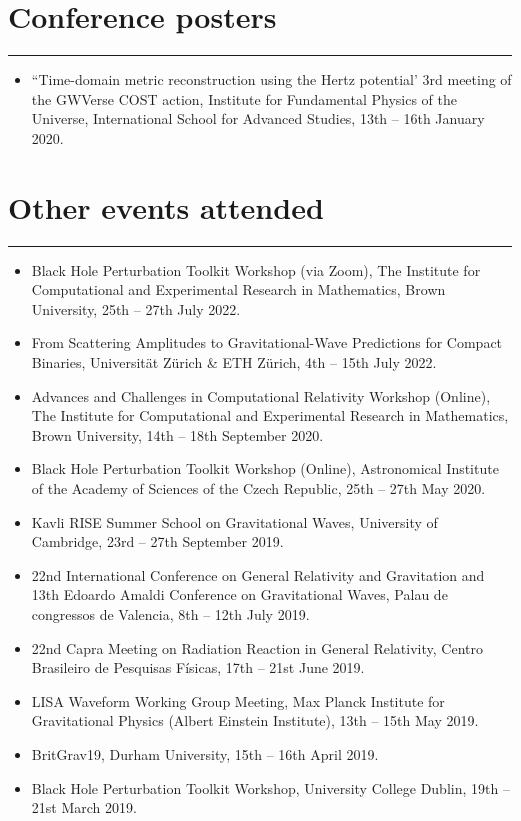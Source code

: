 \documentclass[10.5pt, oneside]{article}   	%
\begin{document}
{\color{Sectioncolour}
\section*{Conference posters}
\vspace{-3mm}
\noindent\rule{\linewidth}{0.6pt}}
\begin{itemize}
\item ``Time-domain metric reconstruction using the Hertz potential' 3rd meeting of the GWVerse COST action, Institute for Fundamental Physics of the Universe, International School for Advanced Studies, 13th -- 16th January 2020.
\end{itemize} 

 
{\color{Sectioncolour}
\section*{Other events attended}
\vspace{-3mm}
\noindent\rule{\linewidth}{0.6pt}}
\begin{itemize}
\item Black Hole Perturbation Toolkit Workshop (via Zoom), The Institute for Computational and Experimental Research in Mathematics, Brown University, 25th -- 27th July 2022.
\item From Scattering Amplitudes to Gravitational-Wave Predictions for Compact Binaries, Universität Zürich \& ETH Zürich, 4th -- 15th July 2022.
\item Advances and Challenges in Computational Relativity Workshop (Online), The Institute for Computational and Experimental Research in Mathematics, Brown University, 14th -- 18th September 2020.
\item Black Hole Perturbation Toolkit Workshop (Online), Astronomical Institute of the Academy of Sciences of the Czech Republic, 25th -- 27th May 2020.
\item Kavli RISE Summer School on Gravitational Waves, University of Cambridge, 23rd -- 27th September 2019.
\item 22nd International Conference on General Relativity and Gravitation and 13th Edoardo Amaldi Conference on Gravitational Waves, Palau de congressos de Valencia, 8th -- 12th July 2019.
\item 22nd Capra Meeting on Radiation Reaction in General Relativity, Centro Brasileiro de Pesquisas Físicas, 17th -- 21st June 2019.
\item LISA Waveform Working Group Meeting, Max Planck Institute for Gravitational Physics (Albert Einstein Institute), 13th -- 15th May 2019.
\item BritGrav19, Durham University, 15th -- 16th April 2019.
\item Black Hole Perturbation Toolkit Workshop, University College Dublin, 19th -- 21st March 2019.
\end{itemize} 
\end{document}
